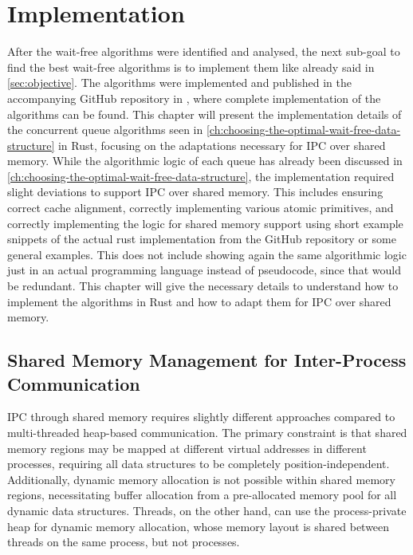 \chapter{Implementation}\label{ch:implementation}

After the wait-free algorithms were identified and analysed, the next sub-goal to find the best wait-free algorithms is to implement them like already said in \cref{sec:objective}. The algorithms were implemented and published in the accompanying GitHub repository in \cite{githubMA}, where complete implementation of the algorithms can be found. This chapter will present the implementation details of the concurrent queue algorithms seen in \cref{ch:choosing-the-optimal-wait-free-data-structure} in Rust, focusing on the adaptations necessary for \ac{IPC} over shared memory. While the algorithmic logic of each queue has already been discussed in \cref{ch:choosing-the-optimal-wait-free-data-structure}, the implementation required slight deviations to support \ac{IPC} over shared memory. This includes ensuring correct cache alignment, correctly implementing various atomic primitives, and correctly implementing the logic for shared memory support using short example snippets of the actual rust implementation from the GitHub repository or some general examples. This does not include showing again the same algorithmic logic just in an actual programming language instead of pseudocode, since that would be redundant. This chapter will give the necessary details to understand how to implement the algorithms in Rust and how to adapt them for \ac{IPC} over shared memory.

\section{Shared Memory Management for Inter-Process Communication}

\ac{IPC} through shared memory requires slightly different approaches compared to multi-threaded heap-based communication. The primary constraint is that shared memory regions may be mapped at different virtual addresses in different processes, requiring all data structures to be completely position-independent. Additionally, dynamic memory allocation is not possible within shared memory regions, necessitating buffer allocation from a pre-allocated memory pool for all dynamic data structures. Threads, on the other hand, can use the process-private heap for dynamic memory allocation, whose memory layout is shared between threads on the same process, but not processes.  

